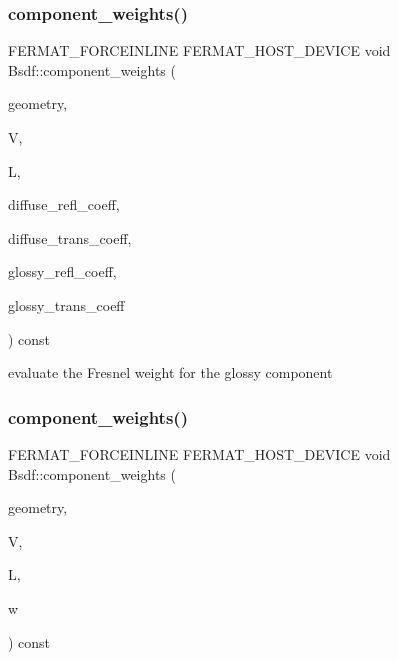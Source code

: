 \subsubsection{\texorpdfstring{component\+\_\+weights()}{component\_weights()}\hspace{0.1cm}{\footnotesize\ttfamily [1/2]}}
{\footnotesize\ttfamily F\+E\+R\+M\+A\+T\+\_\+\+F\+O\+R\+C\+E\+I\+N\+L\+I\+NE F\+E\+R\+M\+A\+T\+\_\+\+H\+O\+S\+T\+\_\+\+D\+E\+V\+I\+CE void Bsdf\+::component\+\_\+weights (\begin{DoxyParamCaption}\item[{const \hyperlink{structcugar_1_1_differential_geometry}{cugar\+::\+Differential\+Geometry} \&}]{geometry,  }\item[{const \hyperlink{structcugar_1_1_vector}{cugar\+::\+Vector3f}}]{V,  }\item[{const \hyperlink{structcugar_1_1_vector}{cugar\+::\+Vector3f}}]{L,  }\item[{\hyperlink{structcugar_1_1_vector}{cugar\+::\+Vector3f} \&}]{diffuse\+\_\+refl\+\_\+coeff,  }\item[{\hyperlink{structcugar_1_1_vector}{cugar\+::\+Vector3f} \&}]{diffuse\+\_\+trans\+\_\+coeff,  }\item[{\hyperlink{structcugar_1_1_vector}{cugar\+::\+Vector3f} \&}]{glossy\+\_\+refl\+\_\+coeff,  }\item[{\hyperlink{structcugar_1_1_vector}{cugar\+::\+Vector3f} \&}]{glossy\+\_\+trans\+\_\+coeff }\end{DoxyParamCaption}) const\hspace{0.3cm}{\ttfamily [inline]}}

evaluate the Fresnel weight for the glossy component \mbox{\label{struct_bsdf_a8390c41355fe415ebd71d3243266c6a9}} 
\subsubsection{\texorpdfstring{component\+\_\+weights()}{component\_weights()}\hspace{0.1cm}{\footnotesize\ttfamily [2/2]}}
{\footnotesize\ttfamily F\+E\+R\+M\+A\+T\+\_\+\+F\+O\+R\+C\+E\+I\+N\+L\+I\+NE F\+E\+R\+M\+A\+T\+\_\+\+H\+O\+S\+T\+\_\+\+D\+E\+V\+I\+CE void Bsdf\+::component\+\_\+weights (\begin{DoxyParamCaption}\item[{const \hyperlink{structcugar_1_1_differential_geometry}{cugar\+::\+Differential\+Geometry} \&}]{geometry,  }\item[{const \hyperlink{structcugar_1_1_vector}{cugar\+::\+Vector3f}}]{V,  }\item[{const \hyperlink{structcugar_1_1_vector}{cugar\+::\+Vector3f}}]{L,  }\item[{\hyperlink{structcugar_1_1_vector}{cugar\+::\+Vector3f} $\ast$}]{w }\end{DoxyParamCaption}) const\hspace{0.3cm}{\ttfamily [inline]}}

